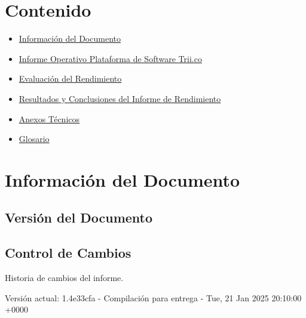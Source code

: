 \documentclass[
  paper=a4,
  ,captions=tableheading
]{scrartcl}
\providecommand{\tightlist}{%
  \setlength{\itemsep}{0pt}\setlength{\parskip}{0pt}}
\renewenvironment{quote}{\begin{customblockquote}\list{}{\rightmargin=0em\leftmargin=0em}%
\item\relax\color{blockquote-text}\ignorespaces}{\unskip\unskip\endlist\end{customblockquote}}
\begin{document}



\section{Contenido}\label{sec:contenido}

\begin{itemize}
\tightlist
\item
  \hyperref[informaciuxf3n-del-documento]{Información del Documento}
\item
  \hyperref[informe-operativo-plataforma-de-software-trii.co]{Informe
  Operativo Plataforma de Software Trii.co}
\item
  \hyperref[evaluaciuxf3n-del-rendimiento]{Evaluación del Rendimiento}
\item
  \hyperref[resultados-y-conclusiones-del-informe-de-rendimiento]{Resultados
  y Conclusiones del Informe de Rendimiento}
\item
  \hyperref[anexos-tuxe9cnicos]{Anexos Técnicos}
\item
  \hyperref[glosario]{Glosario}
\end{itemize}

\newpage

\section{Información del
Documento}\label{sec:informaciuxf3n-del-documento}

\subsection{Versión del Documento}\label{sec:versiuxf3n-del-documento}

\begin{quote}
\end{quote}

\subsection{Control de Cambios}\label{sec:control-de-cambios}

Historia de cambios del informe.

Versión actual: 1.4e33cfa - Compilación para entrega - Tue, 21 Jan 2025
20:10:00 +0000
\end{document}
